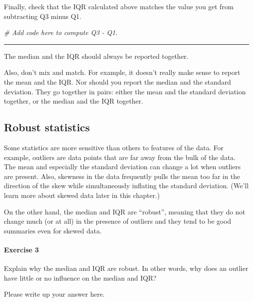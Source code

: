 \documentclass[
]{book}
\newenvironment{Shaded}{\begin{snugshade}}{\end{snugshade}}
\newcommand{\CommentTok}[1]{\textcolor[rgb]{0.56,0.35,0.01}{\textit{#1}}}
\begin{document}
Finally, check that the IQR calculated above matches the value you get from subtracting Q3 minus Q1.

\begin{Shaded}
\begin{Highlighting}[]
\CommentTok{\# Add code here to compute Q3 {-} Q1.}
\end{Highlighting}
\end{Shaded}

\begin{center}\rule{0.5\linewidth}{0.5pt}\end{center}

The median and the IQR should always be reported together.

Also, don't mix and match. For example, it doesn't really make sense to report the mean and the IQR. Nor should you report the median and the standard deviation. They go together in pairs: either the mean and the standard deviation together, or the median and the IQR together.

\hypertarget{numerical-robust}{%
\subsection{Robust statistics}\label{numerical-robust}}

Some statistics are more sensitive than others to features of the data. For example, outliers are data points that are far away from the bulk of the data. The mean and especially the standard deviation can change a lot when outliers are present. Also, skewness in the data frequently pulls the mean too far in the direction of the skew while simultaneously inflating the standard deviation. (We'll learn more about skewed data later in this chapter.)

On the other hand, the median and IQR are ``robust'', meaning that they do not change much (or at all) in the presence of outliers and they tend to be good summaries even for skewed data.

\hypertarget{exercise-3}{%
\paragraph*{Exercise 3}\label{exercise-3}}

Explain why the median and IQR are robust. In other words, why does an outlier have little or no influence on the median and IQR?

Please write up your answer here.
\end{document}
